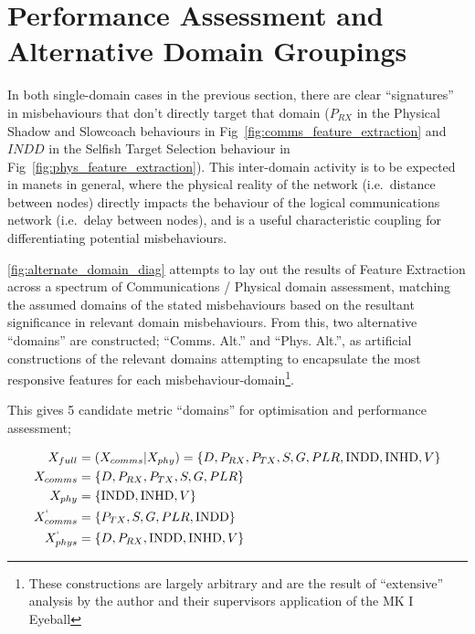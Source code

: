 \section{Performance Assessment and Alternative Domain Groupings}\label{sec:weight_assessment}\label{sec:mdt_alternate}

In both single-domain cases in the previous section, there are clear ``signatures'' in misbehaviours that don't directly target that domain ($P_{RX}$ in the Physical Shadow and Slowcoach behaviours in Fig~\ref{fig:comms_feature_extraction} and $INDD$ in the Selfish Target Selection behaviour in Fig~\ref{fig:phys_feature_extraction}).
This inter-domain activity is to be expected in \glspl{manet} in general, where the physical reality of the network (i.e.\ distance between nodes) directly impacts the behaviour of the logical communications network (i.e.\ delay between nodes), and is a useful characteristic coupling for differentiating potential misbehaviours.

\autoref{fig:alternate_domain_diag} attempts to lay out the results of Feature Extraction across a spectrum of Communications / Physical domain assessment, matching the assumed domains of the stated misbehaviours based on the resultant significance in relevant domain misbehaviours.
From this, two alternative ``domains'' are constructed; ``Comms. Alt.'' and ``Phys. Alt.'', as artificial constructions of the relevant domains attempting to encapsulate the most responsive features for each misbehaviour-domain\footnote{These constructions are largely arbitrary and are the result of ``extensive'' analysis by the author and their supervisors application of the MK I Eyeball}.

This gives 5 candidate metric ``domains'' for optimisation and performance assessment;

\begin{align}
	X_{full} &=  (X_{comms}|X_{phy}) = \{D, P_{RX}, P_{TX}, S, G, PLR, \text{INDD}, \text{INHD}, V\}\\
    X_{comms} &=\{D, P_{RX}, P_{TX}, S, G, PLR\}\\
    X_{phy} &=\{\text{INDD}, \text{INHD}, V\}\\
	X_{comms}^` &= \{P_{TX}, S, G, PLR, \text{INDD}\} \label{eq:comms_alt_vector}\\
	X_{phys}^` &= \{D, P_{RX}, \text{INDD}, \text{INHD}, V\} \label{eq:phys_alt_vector}
\end{align}

